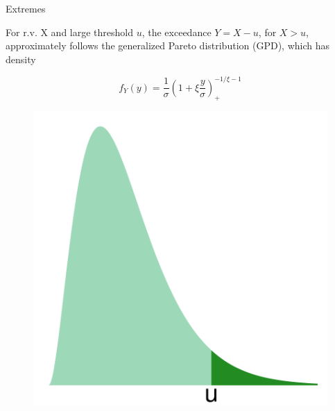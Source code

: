 \documentclass[mathserif, 11pt, t]{beamer}
\begin{document}
\begin{frame}{Extremes}

For r.v. X and large threshold $u$, the exceedance $Y=X-u$, for $X>u$, approximately follows the generalized Pareto distribution (GPD), which has density

\[ f_Y(y) = \frac{1}{\sigma}\left(1+\xi\frac{y}{\sigma}\right)_+^{-1/\xi-1} \]

\begin{figure}
\begin{center}
\includegraphics[scale=0.22]{figs/tail.pdf}
\end{center}
\end{figure}

\end{frame}
\end{document}
